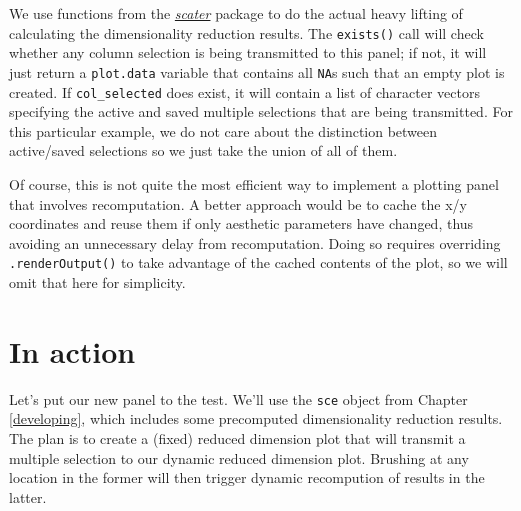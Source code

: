\documentclass[
]{book}
\begin{document}
We use functions from the \emph{\href{https://bioconductor.org/packages/3.11/scater}{scater}} package to do the actual heavy lifting of calculating the dimensionality reduction results.
The \texttt{exists()} call will check whether any column selection is being transmitted to this panel; if not, it will just return a \texttt{plot.data} variable that contains all \texttt{NA}s such that an empty plot is created.
If \texttt{col\_selected} does exist, it will contain a list of character vectors specifying the active and saved multiple selections that are being transmitted.
For this particular example, we do not care about the distinction between active/saved selections so we just take the union of all of them.

Of course, this is not quite the most efficient way to implement a plotting panel that involves recomputation.
A better approach would be to cache the x/y coordinates and reuse them if only aesthetic parameters have changed,
thus avoiding an unnecessary delay from recomputation.
Doing so requires overriding \texttt{.renderOutput()} to take advantage of the cached contents of the plot,
so we will omit that here for simplicity.

\hypertarget{in-action}{%
\section{In action}\label{in-action}}

Let's put our new panel to the test.
We'll use the \texttt{sce} object from Chapter \ref{developing}, which includes some precomputed dimensionality reduction results.
The plan is to create a (fixed) reduced dimension plot that will transmit a multiple selection to our dynamic reduced dimension plot.
Brushing at any location in the former will then trigger dynamic recompution of results in the latter.
\end{document}
